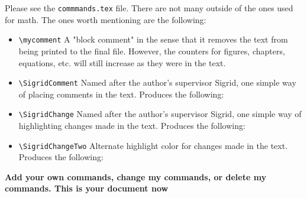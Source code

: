 \documentclass[../thesis.tex]{subfiles}
\begin{document}
Please see the \verb|commmands.tex| file. There are not many outside of the ones used for math. The ones worth mentioning are the following:
\begin{itemize}
    \item {\verb|\mycomment|}  A "block comment" in the sense that it removes the text from being printed to the final file. However, the counters for figures, chapters, equations, etc. will still increase as they were in the text.
    \item {\verb|\SigridComment|}  Named after the author's supervisor Sigrid, one simple way of placing comments in the text. Produces the following: 
    \item {\verb|\SigridChange|}  Named after the author's supervisor Sigrid, one simple way of highlighting changes made in the text. Produces the following: 
    \item {\verb|\SigridChangeTwo|}  Alternate highlight color for changes made in the text. Produces the following: 
\end{itemize} 

\large \textbf{Add your own commands, change my commands, or delete my commands. This is your document now}
\end{document}
